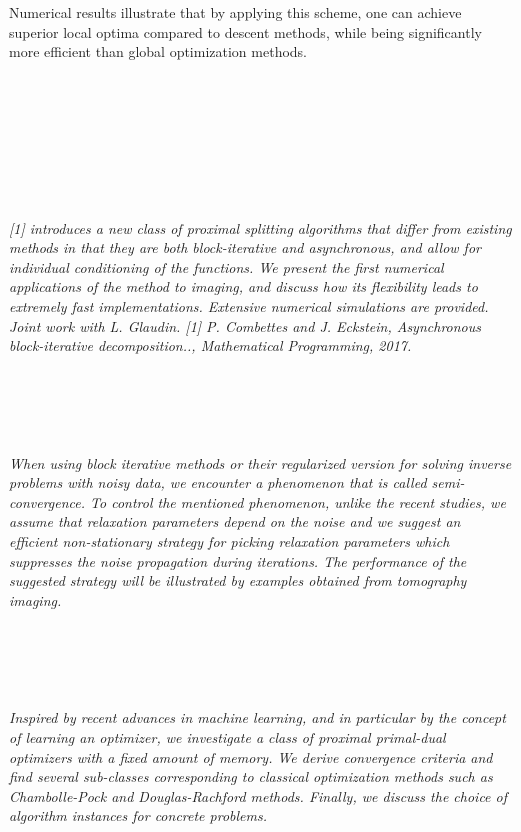\begin{multicols}{2}
{Numerical results illustrate that by applying this scheme, one can achieve superior local optima compared to descent methods, while being significantly more efficient than global optimization methods.}\\
\\ 
      \\
      \\\\
      \\
      \\\\
\\
    \textit{[1] introduces a new class of proximal splitting algorithms that 
differ from existing methods in that they are both block-iterative 
and asynchronous, and allow for individual conditioning of the 
functions. We present the first numerical applications of the
method to imaging, and discuss how its flexibility leads to
extremely fast implementations.  Extensive numerical simulations
are provided. Joint work with L.  Glaudin.
[1] P. Combettes and J. Eckstein, Asynchronous block-iterative
decomposition.., Mathematical Programming, 2017.}\\
\\ 
      \\
      \\\\
\\
    \textit{When using block iterative methods or their regularized version for solving inverse problems with noisy data, we encounter a phenomenon that is called semi-convergence. To control the mentioned phenomenon, unlike the recent studies, we assume that relaxation parameters depend on the noise and we suggest an efficient non-stationary strategy for picking relaxation parameters which suppresses the noise propagation during iterations. The performance of the suggested strategy will be illustrated by examples obtained from tomography imaging.}\\
\\ 
      \\
      \\\\
\\
    \textit{Inspired by recent advances in machine learning, and in particular by the concept of learning an optimizer, we investigate a class of proximal primal-dual optimizers with a fixed amount of memory. We derive convergence criteria and find several sub-classes corresponding to classical optimization methods such as Chambolle-Pock and Douglas-Rachford methods. Finally, we discuss the choice of algorithm instances for concrete problems.}\\

\end{multicols}
